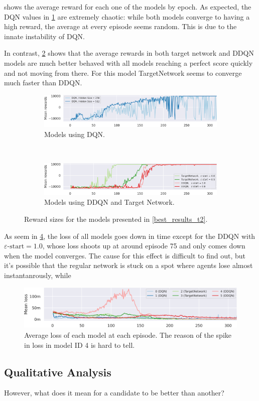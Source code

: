  shows the average reward for each one of the models by epoch.
As expected, the DQN values in \cref{dqn_avg_reward} are extremely chaotic: while both models converge to having a high reward, the average at every episode seems random.
This is due to the innate instability of DQN\cite{reinforcement_learning_introduction}.

In contrast, \cref{rest_avg_reward} shows that the average rewards in both target network and DDQN models are much better behaved with all models reaching a perfect score quickly and not moving from there.
For this model TargetNetwork seems to converge much faster than DDQN.

\begin{figure}[h]
	\begin{subfigure}{\textwidth}
		\includegraphics[width=\textwidth]{dqn_reward_size.png}
		\caption{Models using DQN.}
		\label{dqn_avg_reward}
	\end{subfigure} \\[1ex]
	\begin{subfigure}{\textwidth}
		\includegraphics[width=\textwidth]{rest_reward_size.png}
		\caption{Models using DDQN and Target Network.}
		\label{rest_avg_reward}
	\end{subfigure}
	\caption{Reward sizes for the models presented in \cref{best_results_t2}.}
	\label{avg_reward}
\end{figure}

As seem in \cref{losses}, the loss of all models goes down in time except for the DDQN with $\varepsilon\text{-start} = 1.0$, whose loss shoots up at around episode 75 and only comes down when the model converges.
The cause for this effect is difficult to find out, but it's possible that the regular network is stuck on a spot where agents lose almost instantanrously, while 
\begin{figure}[h]
	\includegraphics[width=\textwidth]{losses.png}
	\caption{Average loss of each model at each episode. The reason of the spike in loss in model ID 4 is hard to tell.}
	\label{losses}
\end{figure}

\subsection{Qualitative Analysis}

However, what does it mean for a candidate to be better than another?
